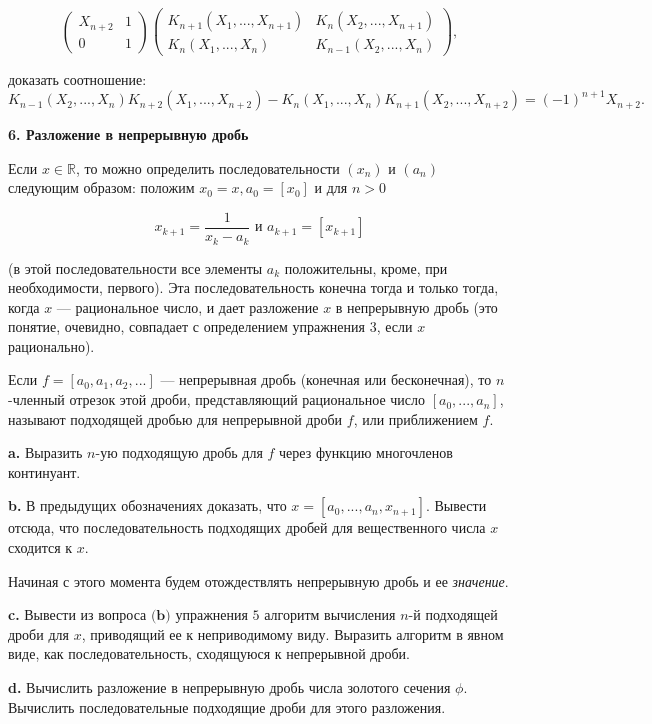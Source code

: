 \documentclass{mai_book}
\begin{document}
\[
\begin{pmatrix}
X_{n+2} & 1\\
0 & 1
\end{pmatrix} \begin{pmatrix}
K_{n+1}(X_1,...,X_{n+1}) & K_n(X_2,...,X_{n+1})\\
K_n(X_1,...,X_n) & K_{n-1}(X_2,...,X_n)
\end{pmatrix},
\]

доказать соотношение:
\[
K_{n-1}(X_2,...,X_n)K_{n+2}(X_1,...,X_{n+2})-K_n(X_1,...,X_n)K_{n+1}(X_2,...,X_{n+2}) = (-1)^{n+1}X_{n+2}.
\]

\noindent \textbf{6. Разложение в непрерывную дробь}

Если $x \in \mathbb{R}$, то можно определить последовательности $(x_n)$ и $(a_n)$ следующим образом: положим $x_0 = x, a_0 = [x_0]$ и для $n>0$

\[
x_{k+1} = \frac{1}{x_k-a_k} \text{ и } a_{k+1} = [x_{k+1}]
\]

\noindent (в этой последовательности все элементы $a_k$ положительны, кроме,
при необходимости, первого). Эта последовательность конечна тогда
и только тогда, когда $x$ — рациональное число, и дает разложение $x$ в
непрерывную дробь (это понятие, очевидно, совпадает с определением
упражнения 3, если $x$ рационально).

Если $f = [a_0,a_1,a_2,...]$ — непрерывная дробь (конечная или 
бесконечная), то $n$-членный отрезок этой дроби, представляющий 
рациональное число $[a_0,...,a_n]$, называют подходящей дробью для непрерывной дроби $f$, или приближением $f$.

\textbf{a.} Выразить $n$-ую подходящую дробь для $f$ через функцию 
многочленов континуант.

\textbf{b.} В предыдущих обозначениях доказать, что $x = [a_0,...,a_n,x_{n+1}]$. Вывести отсюда, что последовательность подходящих дробей для 
вещественного числа $x$ сходится к $x$.

Начиная с этого момента будем отождествлять непрерывную дробь
и ее \textit{значение}.

\textbf{c.} Вывести из вопроса $\textbf{(b)}$ упражнения $5$ алгоритм вычисления $n$-й подходящей дроби для $x$, приводящий ее к неприводимому виду. Выразить алгоритм в явном виде, как последовательность, сходящуюся к
непрерывной дроби.

\textbf{d.} Вычислить разложение в непрерывную дробь числа золотого 
сечения $\phi$. Вычислить последовательные подходящие дроби для этого 
разложения.
\\
\end{document}
